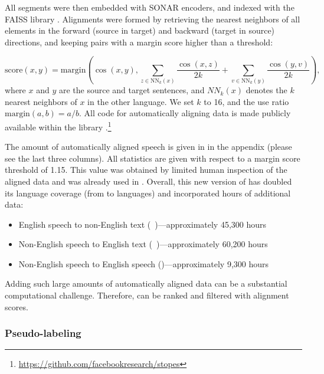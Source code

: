 All segments were then embedded with SONAR encoders, and indexed with the FAISS library \citep{johnson2019billion}. Alignments were formed by retrieving the nearest neighbors of all elements in the forward (source in target) and backward (target in source) directions, and keeping pairs with a margin score \citep{Artetxe:2019:mine_acl} higher than a threshold:

\begin{equation}
    \text{score}(x, y) = \text{margin}\left( \cos(x,y), 
    \sum_{z \in \textrm{NN}_k(x)} \frac{\cos(x, z)}{2k} + \sum_{v \in \textrm{NN}_k(y)} \frac{\cos(y, v)}{2k} \right),
\end{equation}
where $x$ and $y$ are the source and target sentences, and $NN_k(x)$ denotes the $k$ nearest neighbors of $x$ in the other language. We set $k$ to 16, and the use ratio $\text{margin}(a,b)=a/b$.
All code for automatically aligning data is made publicly available within the \stopes library \citep{andrews-etal-2022-stopes}.\footnote{\url{https://github.com/facebookresearch/stopes}} 

The amount of automatically aligned speech is given in  in the appendix (please see the last three columns).
All statistics are given with respect to a margin score threshold of 1.15. This value was obtained by limited human inspection of the aligned data and was already used in \citet{SeamlessM4TArXiv}.
Overall, this new version of \seamlessalign has doubled its language coverage (from \NbLangsMined to \NbLangsMinedVtwo languages) and incorporated \addtlminedhoursVtwo hours of additional data:
\begin{itemize}
    \item English speech to non-English text (\StoT~\engx)—approximately 45,300 hours
    \item Non-English speech to English text (\StoT~\xeng)—approximately 60,200 hours
    \item Non-English speech to English speech (\StoS)—approximately 9,300 hours
\end{itemize}
Adding such large amounts of automatically aligned data can be a substantial computational challenge. Therefore, \seamlessalign can be ranked and filtered with \sonar alignment scores.


\subsubsection{Pseudo-labeling}\label{sec:offline:pseudo}

